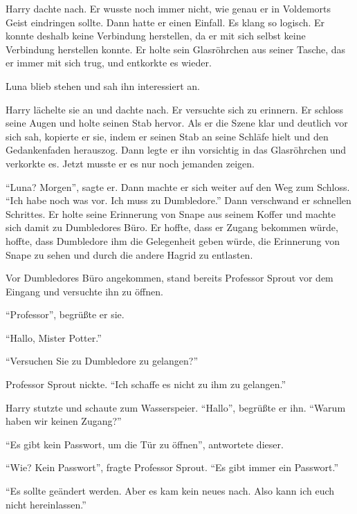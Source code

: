 \begin{safedivide}
\fskdivider
\end{safedivide}

Harry dachte nach. Er wusste noch immer nicht, wie genau er in Voldemorts Geist eindringen sollte. Dann hatte er einen Einfall. Es klang so logisch. Er konnte deshalb keine Verbindung herstellen, da er mit sich selbst keine Verbindung herstellen konnte. Er holte sein Glasröhrchen aus seiner Tasche, das er immer mit sich trug, und entkorkte es wieder.

Luna blieb stehen und sah ihn interessiert an.

Harry lächelte sie an und dachte nach. Er versuchte sich zu erinnern. Er schloss seine Augen und holte seinen Stab hervor. Als er die Szene klar und deutlich vor sich sah, kopierte er sie, indem er seinen Stab an seine Schläfe hielt und den Gedankenfaden herauszog. Dann legte er ihn vorsichtig in das Glasröhrchen und verkorkte es. Jetzt musste er es nur noch jemanden zeigen.

\enquote{Luna? Morgen}, sagte er. Dann machte er sich weiter auf den Weg zum Schloss. \enquote{Ich habe noch was vor. Ich muss zu Dumbledore.} Dann verschwand er schnellen Schrittes. Er holte seine Erinnerung von Snape aus seinem Koffer und machte sich damit zu Dumbledores Büro. Er hoffte, dass er Zugang bekommen würde, hoffte, dass Dumbledore ihm die Gelegenheit geben würde, die Erinnerung von Snape zu sehen und durch die andere Hagrid zu entlasten.

Vor Dumbledores Büro angekommen, stand bereits Professor Sprout vor dem Eingang und versuchte ihn zu öffnen.

\enquote{Professor}, begrüßte er sie.

\enquote{Hallo, Mister Potter.}

\enquote{Versuchen Sie zu Dumbledore zu gelangen?}

Professor Sprout nickte. \enquote{Ich schaffe es nicht zu ihm zu gelangen.}

Harry stutzte und schaute zum Wasserspeier. \enquote{Hallo}, begrüßte er ihn. \enquote{Warum haben wir keinen Zugang?}

\enquote{Es gibt kein Passwort, um die Tür zu öffnen}, antwortete dieser.

\enquote{Wie? Kein Passwort}, fragte Professor Sprout. \enquote{Es gibt immer ein Passwort.}

\enquote{Es sollte geändert werden. Aber es kam kein neues nach. Also kann ich euch nicht hereinlassen.}

